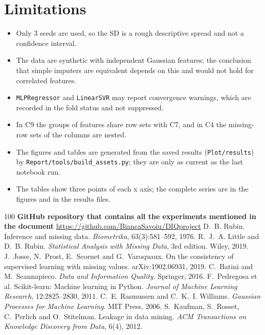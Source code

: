\documentclass{Configuration_Files/PoliMi3i_thesis}
\begin{document}
\section{Limitations}
\label{sec:limitations}%
\begin{itemize}
    \item Only 3 seeds are used, so the SD is a rough descriptive spread and not a confidence interval.
    \item The data are synthetic with independent Gaussian features; the conclusion that simple imputers are equivalent depends on this and would not hold for correlated features.
    \item \texttt{MLPRegressor} and \texttt{LinearSVR} may report convergence warnings, which are recorded in the fold status and not suppressed.
    \item In C9 the groups of features share row sets with C7, and in C4 the missing-row sets of the columns are nested.
    \item The figures and tables are generated from the saved results (\texttt{Plot/results}) by \texttt{Report/\allowbreak tools/\allowbreak build\_\allowbreak assets.py}; they are only as current as the last notebook run.
    \item The tables show three points of each x axis; the complete series are in the figures and in the results files.
\end{itemize}

\cleardoublepage
\begin{thebibliography}{100}
         \textbf{GitHub repository that contains all the experiments mentioned in the document} \href{https://github.com/BiancaSavoiu/DIQ_project}{https://github.com/BiancaSavoiu/DIQproject}
         D.~B. Rubin. Inference and missing data. \textit{Biometrika}, 63(3):581--592, 1976.
         R.~J.~A. Little and D.~B. Rubin. \textit{Statistical Analysis with Missing Data}, 3rd edition. Wiley, 2019.
         J.~Josse, N.~Prost, E.~Scornet and G.~Varoquaux. On the consistency of supervised learning with missing values. arXiv:1902.06931, 2019.
         C.~Batini and M.~Scannapieco. \textit{Data and Information Quality}. Springer, 2016.
         F.~Pedregosa et al. Scikit-learn: Machine learning in Python. \textit{Journal of Machine Learning Research}, 12:2825--2830, 2011.
         C.~E. Rasmussen and C.~K.~I. Williams. \textit{Gaussian Processes for Machine Learning}. MIT Press, 2006.
         S.~Kaufman, S.~Rosset, C.~Perlich and O.~Stitelman. Leakage in data mining. \textit{ACM Transactions on Knowledge Discovery from Data}, 6(4), 2012.
    \end{thebibliography}
\end{document}
